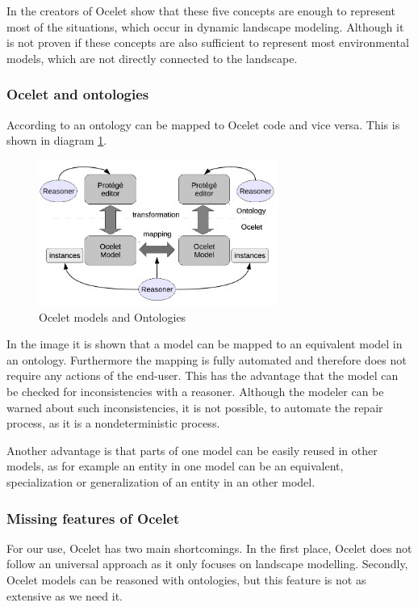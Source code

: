 \par
In \autocite{dsl:ocelet-design} the creators of Ocelet show that these five concepts are enough to represent most of the situations, which occur in dynamic landscape modeling. Although it is not proven if these concepts are also sufficient to represent most environmental models, which are not directly connected to the landscape.

\subsubsection{Ocelet and ontologies}
\par
According to \autocite{dsl:ocelet-design} an ontology can be mapped to Ocelet code and vice versa. This is shown in diagram \ref{fig:ocelet_and_ontologies}.
\begin{figure}[h]
	\centering
	\includegraphics[width=0.7\textwidth]{pics/ocelet/ocelet_and_ontologies.png}
	\caption{Ocelet models and Ontologies  \label{fig:ocelet_and_ontologies}}	
\end{figure}
\par
In the image it is shown that a model can be mapped to an equivalent model in an ontology. Furthermore the mapping is fully automated and therefore does not require any actions of the end-user. This has the advantage that the model can be checked for inconsistencies with a reasoner. Although the modeler can be warned about such inconsistencies, it is not possible, to automate the repair process, as it is a nondeterministic process.  
\par
Another advantage is that parts of one model can be easily reused in other models, as for example an entity in one model can be an equivalent, specialization or generalization of an entity in an other model.

\subsubsection{Missing features of Ocelet}
\par
For our use, Ocelet has two main shortcomings. In the first place, Ocelet does not follow an universal approach as it only focuses on landscape modelling. Secondly, Ocelet models can be reasoned with ontologies, but this feature is not as extensive as we need it.

